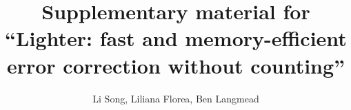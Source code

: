 \documentclass[10pt]{article}
\begin{document}
\newcommand{\forexample}{e.g.\@\xspace}
\newcommand{\thatis}{i.e.\@\xspace}
\newcommand{\andothers}{et al.\@\xspace}
\newcommand{\kmer}{\ensuremath{k}-mer\xspace}
\newcommand{\kmers}{\ensuremath{k}-mers\xspace}
\newcommand{\tool}{Lighter\xspace}
\newcommand{\ecoli}{\emph{E. coli}\xspace}
\newcommand{\elegans}{\emph{C. elegans}\xspace}

\newcommand\myworries[1]{\textcolor{red}{#1}}%


\title{Supplementary material for ``Lighter: fast and memory-efficient error correction without counting''}


\author{Li Song, Liliana Florea, Ben Langmead}

\renewcommand\Authands{ and }




\maketitle


\end{document}
